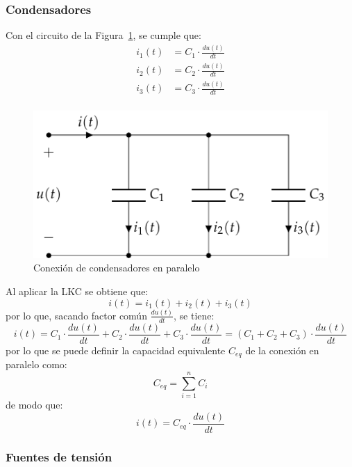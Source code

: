		\subsubsection{Condensadores}
		Con el circuito de la
                Figura~\ref{fig:condensadores-paralelo}, se cumple
                que:
		\begin{align*}
                  i_1(t) &= C_1 \cdot \frac{du(t)}{dt}\\
                  i_2(t) &= C_2 \cdot \frac{du(t)}{dt}\\
                  i_3(t) &= C_3 \cdot \frac{du(t)}{dt}\\
		\end{align*}
		\begin{figure}[H]
                  \centering
                  \includegraphics[width=0.4\linewidth]{../figs/CondensadoresParalelo.pdf}
                  \caption{Conexión de condensadores en paralelo}
                  \label{fig:condensadores-paralelo}
		\end{figure}
		Al aplicar la LKC se obtiene que:
		\begin{equation*}
                  i(t) = i_1(t) + i_2(t) + i_3(t)
		\end{equation*}
		por lo que, sacando factor común $\frac{du(t)}{dt}$,
                se tiene:
		\begin{equation*}
                  i(t)=C_1\cdot \dfrac{du(t)}{dt}+ C_2\cdot \dfrac{du(t)}{dt}+ C_3\cdot \dfrac{du(t)}{dt}=(C_1+C_2+C_3)\cdot\dfrac{du(t)}{dt}
		\end{equation*}
		por lo que se puede definir la capacidad equivalente
                $C_{eq}$ de la conexión en paralelo como:
		\begin{equation}
                  \boxed{C_{eq} = \sum_{i = 1}^n C_i}
		\end{equation}
		de modo que:
		\begin{equation*}
                  i(t) = C_{eq} \cdot \frac{du(t)}{dt}
		\end{equation*}
		
		\subsubsection{Fuentes de tensión}
		
